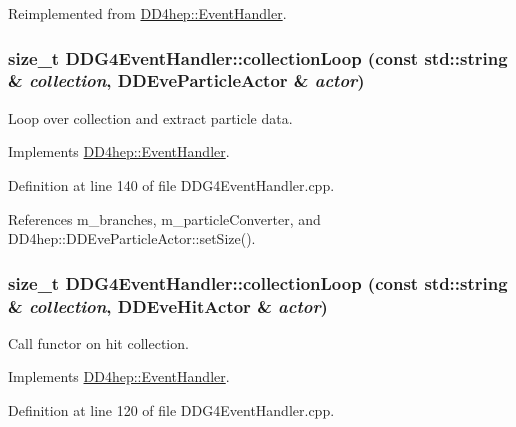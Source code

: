 Reimplemented from \hyperlink{class_d_d4hep_1_1_event_handler_a44c310a4296693f09e62adbac3fbe2c6}{DD4hep::EventHandler}.\hypertarget{class_d_d4hep_1_1_d_d_g4_event_handler_a9f45863ae9406f8d5ec1d309321c50d6}{
\subsubsection[{collectionLoop}]{\setlength{\rightskip}{0pt plus 5cm}size\_\-t DDG4EventHandler::collectionLoop (const std::string \& {\em collection}, \/  {\bf DDEveParticleActor} \& {\em actor})}}
\label{class_d_d4hep_1_1_d_d_g4_event_handler_a9f45863ae9406f8d5ec1d309321c50d6}


Loop over collection and extract particle data. 

Implements \hyperlink{class_d_d4hep_1_1_event_handler_ae43595c2760736a7ca628183a2c91ec2}{DD4hep::EventHandler}.

Definition at line 140 of file DDG4EventHandler.cpp.

References m\_\-branches, m\_\-particleConverter, and DD4hep::DDEveParticleActor::setSize().\hypertarget{class_d_d4hep_1_1_d_d_g4_event_handler_a65645df58f694dea050f7d57d353dff4}{
\subsubsection[{collectionLoop}]{\setlength{\rightskip}{0pt plus 5cm}size\_\-t DDG4EventHandler::collectionLoop (const std::string \& {\em collection}, \/  {\bf DDEveHitActor} \& {\em actor})}}
\label{class_d_d4hep_1_1_d_d_g4_event_handler_a65645df58f694dea050f7d57d353dff4}


Call functor on hit collection. 

Implements \hyperlink{class_d_d4hep_1_1_event_handler_a454baeb81b675f3ebd8bb4293064b787}{DD4hep::EventHandler}.

Definition at line 120 of file DDG4EventHandler.cpp.

